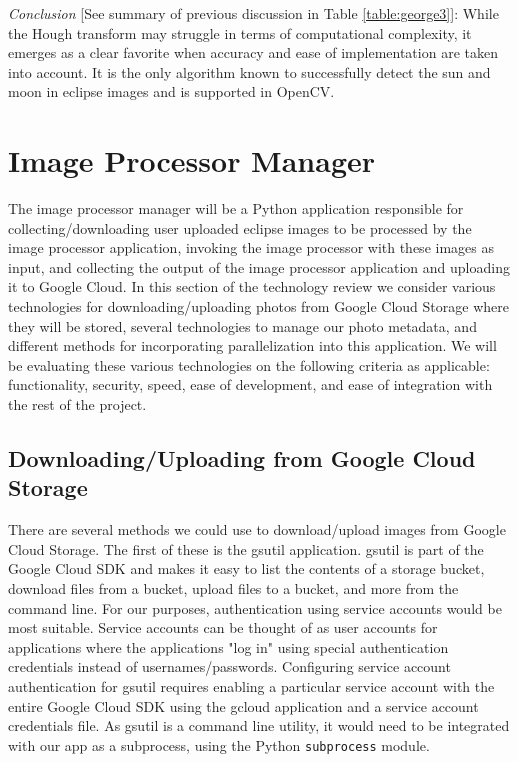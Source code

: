 \documentclass[10pt, onecolumn, draftclsnofoot, letterpaper, compsoc]{IEEEtran}
\begin{document}
\textit{Conclusion} [See summary of previous discussion in Table
\ref{table:george3}]: While the Hough transform may struggle in terms of computational
complexity, it emerges as a clear favorite when accuracy and ease of
implementation are taken into account. It is the only algorithm known to
successfully detect the sun and moon in eclipse images and is supported in
OpenCV.

\section{Image Processor Manager}

The image processor manager will be a Python application responsible for
collecting/downloading user uploaded eclipse images to be processed by the image
processor application, invoking the image processor with these images as input,
and collecting the output of the image processor application and uploading it
to Google Cloud. In this section of the technology review we consider various
technologies for downloading/uploading photos from Google Cloud Storage where
they will be stored, several technologies to manage our photo metadata, and
different methods for incorporating parallelization into this application. We will
be evaluating these various technologies on the following criteria as applicable:
functionality, security, speed, ease of development, and ease of integration with
the rest of the project. \\

\subsection{Downloading/Uploading from Google Cloud Storage}

There are several methods we could use to download/upload images from Google Cloud
Storage. The first of these is the gsutil application. gsutil is part of the Google
Cloud SDK and makes it easy to list the contents of a storage bucket, download files
from a bucket, upload files to a bucket, and more from the command
line\cite{gsutil, cloudStorage}. For our purposes, authentication using
service accounts would be most suitable. Service accounts can be
thought of as user accounts for applications where the applications "log in"
using special authentication credentials instead of usernames/passwords. Configuring
service account authentication for gsutil requires enabling a particular service
account with the entire Google Cloud SDK using the gcloud application and a service
account credentials file. As gsutil is a command line utility, it would need to be
integrated with our app as a subprocess, using the Python {\tt subprocess} module. \\
\end{document}

